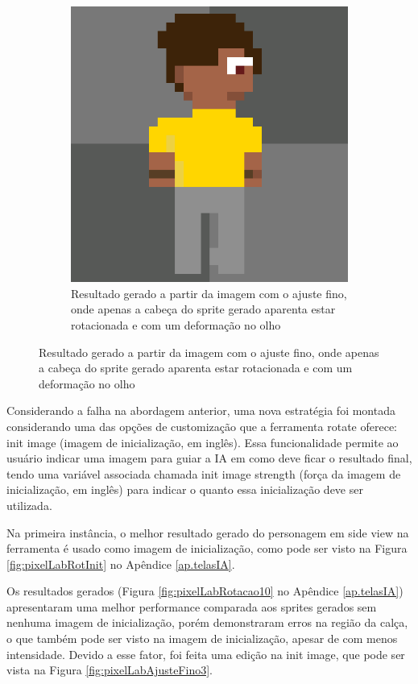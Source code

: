 \begin{figure}[htbp]
\begin{subfigure}{0.45\linewidth}
        \includegraphics[width=1\linewidth]{figs/pixelLab/dia2/rot45fix3res2.PNG}
        \caption{\small Resultado gerado a partir da imagem com o ajuste fino, onde apenas a cabeça do sprite gerado aparenta estar rotacionada e com um deformação no olho}
        \label{fig:pixelComparaAjusteDepois}
    \end{subfigure}

\end{figure}

Considerando a falha na abordagem anterior, uma nova estratégia foi montada considerando uma das opções de customização que a ferramenta rotate oferece: init image (imagem de inicialização, em inglês). Essa funcionalidade permite ao usuário indicar uma imagem para guiar a IA em como deve ficar o resultado final, tendo uma variável associada chamada init image strength (força da imagem de inicialização, em inglês) para indicar o quanto essa inicialização deve ser utilizada. 

Na primeira instância, o melhor resultado gerado do personagem em side view na ferramenta é usado como imagem de inicialização, como pode ser visto na Figura \ref{fig:pixelLabRotInit} no Apêndice \ref{ap.telasIA}.

Os resultados gerados (Figura \ref{fig:pixelLabRotacao10} no Apêndice \ref{ap.telasIA}) apresentaram uma melhor performance comparada aos sprites gerados sem nenhuma imagem de inicialização, porém demonstraram erros na região da calça, o que também pode ser visto na imagem de inicialização, apesar de com menos intensidade. Devido a esse fator, foi feita uma edição na init image, que pode ser vista na Figura \ref{fig:pixelLabAjusteFino3}.

